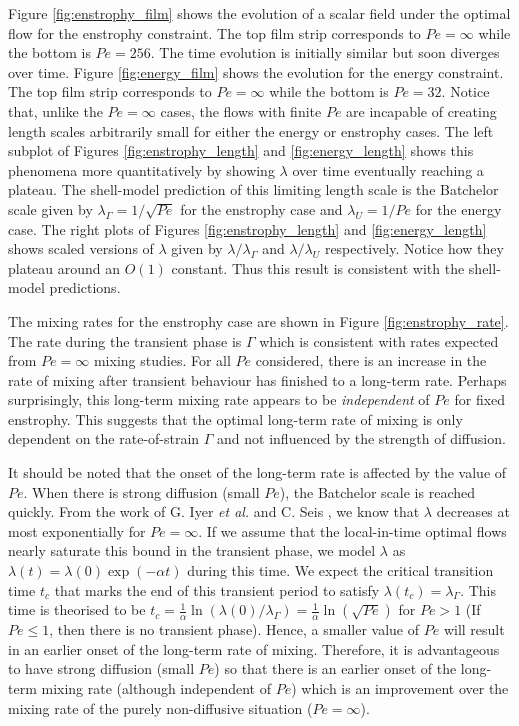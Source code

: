 \documentclass[12pt]{iopart}
\begin{document}
 Figure \ref{fig:enstrophy_film} shows the evolution of a scalar field under the optimal flow for the enstrophy constraint. The top film strip corresponds to $Pe =\infty$ while the bottom is $Pe = 256$. The time evolution is initially similar but soon diverges over time. Figure \ref{fig:energy_film} shows the evolution for the energy constraint. The top film strip corresponds to $Pe =\infty$ while the bottom is $Pe = 32$. Notice that, unlike the $Pe = \infty$ cases, the flows with finite $Pe$ are incapable of creating length scales arbitrarily small for either the energy or enstrophy cases.  The left subplot of Figures \ref{fig:enstrophy_length} and \ref{fig:energy_length} shows this phenomena more quantitatively by showing $\lambda$ over time eventually reaching a plateau. The shell-model prediction of this limiting length scale is the Batchelor scale given by $\lambda_{\Gamma} = 1/\sqrt{Pe}$ for the enstrophy case and  $\lambda_{U} = 1/Pe$ for the energy case. The right plots of Figures \ref{fig:enstrophy_length} and \ref{fig:energy_length} shows scaled versions of $\lambda$ given by  $\lambda/\lambda_{\Gamma}$ and $\lambda/\lambda_{U}$ respectively.  Notice how they plateau around an $O(1)$ constant. Thus this result is consistent with the shell-model predictions. 
   
The mixing rates for the enstrophy case are shown in Figure \ref{fig:enstrophy_rate}. The rate during the transient phase is $\Gamma$ which is consistent with rates expected from $Pe=\infty$ mixing studies. For all $Pe$ considered, there is an increase in the rate of mixing after transient behaviour has finished to a long-term rate. Perhaps surprisingly, this long-term mixing rate appears to be {\it independent} of $Pe$ for fixed enstrophy. This suggests that the optimal long-term rate of mixing is only dependent on the rate-of-strain $\Gamma$ and not influenced by the strength of diffusion. 

It should be noted that the onset of the long-term rate is affected by the value of $Pe$. When there is strong diffusion (small $Pe$), the Batchelor scale is reached quickly. From the work of G. Iyer {\it et al.} \cite{GI2014} and C. Seis \cite{CS2013}, we know that $\lambda$ decreases at most exponentially for $Pe = \infty$. If we assume that the local-in-time optimal flows nearly saturate this bound in the transient phase, we model $\lambda$ as  $\lambda (t) = \lambda(0)\exp(- \alpha t) $ during this time. We expect the critical transition time $t_{c}$ that marks the end of this transient period to satisfy $\lambda(t_{c})= \lambda_{\Gamma}$. This time is theorised to be $t_{c}=\frac{1}{\alpha}\ln(\lambda(0)/\lambda_{\Gamma}) = \frac{1}{\alpha}\ln ( \sqrt{Pe} )$ for $Pe>1$ (If $Pe \leq 1$, then there is no transient phase). Hence, a smaller value of $Pe$ will result in an earlier onset of the long-term rate of mixing. Therefore, it is advantageous to have strong diffusion (small $Pe$) so that there is an earlier onset of the long-term mixing rate (although independent of $Pe$) which is an improvement over the mixing rate of the purely non-diffusive situation ($Pe=\infty$).
 
\end{document}
